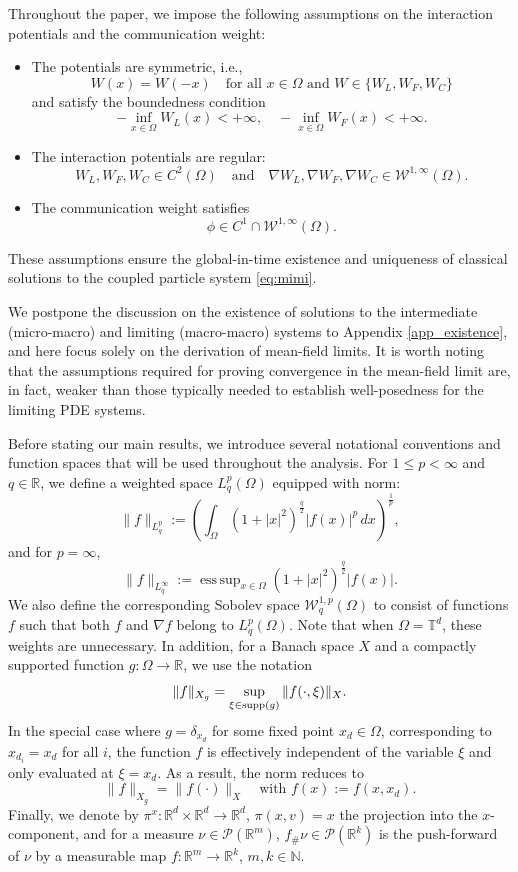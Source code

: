 \documentclass[10pt, reqno]{amsart}
\theoremstyle{definition}
\theoremstyle{remark}
\numberwithin{equation}{section}
\newcommand{\calP}{\mathcal P}
\newcommand{\calW}{\mathcal W}
\newcommand{\N}{\mathbb{N}}
\newcommand{\R}{\mathbb{R}}
\DeclareMathOperator*{\esssup}{ess\,sup}
\begin{document}
Throughout the paper, we impose the following assumptions on the interaction potentials and the communication weight:
\begin{itemize}
\item[{\bf (A1)}] The potentials are symmetric, i.e.,
\[
W(x) = W(-x) \quad \mbox{for all $x \in \Omega$ and $W \in \{W_L, W_F, W_C\}$}
\]
and satisfy the boundedness condition
\[
 -\inf_{x\in \Omega} W_L(x) < +\infty, \quad -\inf_{x\in \Omega} W_F(x) < +\infty .
\]
\item[{\bf (A2)}] The interaction potentials are regular:
\[
W_L, W_F, W_C \in C^2(\Omega) \quad \mbox{and} \quad \nabla W_L, \nabla W_F, \nabla W_C \in \calW^{1,\infty}(\Omega) .
\]
\item[{\bf (A3)}] The communication weight satisfies
\[
\phi \in C^1 \cap \calW^{1,\infty}(\Omega).
\]
\end{itemize} 
These assumptions ensure the global-in-time existence and uniqueness of classical solutions to the coupled particle system \eqref{eq:mimi}.

We postpone the discussion on the existence of solutions to the intermediate (micro-macro) and limiting (macro-macro) systems to Appendix \ref{app_existence}, and here focus solely on the derivation of mean-field limits. It is worth noting that the assumptions required for proving convergence in the mean-field limit are, in fact, weaker than those typically needed to establish well-posedness for the limiting PDE systems.

Before stating our main results, we introduce several notational conventions and function spaces that will be used throughout the analysis. For $1 \leq p < \infty$ and $q \in \R$, we define a weighted space $L^p_q(\Omega)$ equipped with norm:
\[
\|f\|_{L^p_q}:= \left(\int_{\Omega} (1+|x|^2)^{\frac q2} |f(x)|^p\,dx\right)^\frac1p, 
\]
and for $p = \infty$,
\[
\|f\|_{L^\infty_q}:= \esssup_{x \in \Omega} (1+|x|^2)^{\frac q2} |f(x)|.
\]
We also define the corresponding Sobolev space $\calW^{1,p}_q(\Omega)$ to consist of functions $f$ such that both $f$ and $\nabla f$ belong to $L^p_q(\Omega)$. Note that when $\Omega = \mathbb{T}^d$, these weights are unnecessary. In addition, for a Banach space $X$ and a compactly supported function $g: \Omega \to \mathbb{R}$, we use the notation
\[
\|f\|_{X_g} = \sup_{\xi \in {\rm supp}(g)} \|f(\cdot, \xi)\|_{X}.
\]
In the special case where $g = \delta_{x_d}$ for some fixed point $x_d \in \Omega$, corresponding to $x_{d_i} = x_d$ for all $i$, the function $f$ is effectively independent of the variable $\xi$ and only evaluated at $\xi = x_d$. As a result, the norm reduces to
\[
\|f\|_{X_g} = \|f(\cdot)\|_X \quad \mbox{with } f(x) := f(x, x_d).
\]
Finally, we denote by $\pi^x:\R^d\times\R^d\to\R^d$, $\pi(x,v)=x$ the projection into the $x$-component, and for a measure $\nu\in\calP(\R^m)$, $f {}_\# \nu\in\calP(\R^k)$ is the push-forward of $\nu$ by a measurable map $f :\R^m \to \R^k$, $m,k\in\N$.
\end{document}
